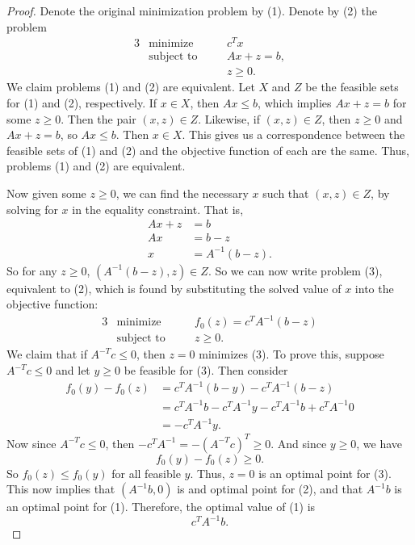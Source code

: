 \documentclass[12pt]{article}
\begin{document}
\begin{proof}
    Denote the original minimization problem by (1). Denote by (2) the problem
    \begin{alignat*}{3}
        &\text{minimize}    &\quad& c^Tx \\
        &\text{subject to}  &\quad& Ax + z= b, \\
                                &&& z\geq 0.
    \end{alignat*}
    We claim problems (1) and (2) are equivalent. Let $X$ and $Z$ be the feasible sets for (1) and (2), respectively. If $x\in X$, then $Ax\leq b$, which implies $Ax+z = b$ for some $z\geq 0$. Then the pair $(x,z)\in Z$. Likewise, if $(x,z)\in Z$, then $z\geq0$ and $Ax+z=b$, so $Ax\leq b$. Then $x\in X$. This gives us a correspondence between the feasible sets of (1) and (2) and the objective function of each are the same. Thus, problems (1) and (2) are equivalent. 
    
    Now given some $z\geq0$, we can find the necessary $x$ such that $(x,z)\in Z$, by solving for $x$ in the equality constraint. That is,
    \begin{align*}
        Ax + z &= b \\
        Ax &= b-z \\
        x &= A^{-1}(b-z).
    \end{align*}
    So for any $z\geq0$, $(A^{-1}(b-z), z)\in Z$. So we can now write problem (3), equivalent to (2), which is found by substituting the solved value of $x$ into the objective function:
    \begin{alignat*}{3}
        &\text{minimize}    &\quad& f_0(z) = c^TA^{-1}(b-z) \\
        &\text{subject to}  &\quad& z\geq 0.
    \end{alignat*}
    We claim that if $A^{-T}c\leq0$, then $z=0$ minimizes (3). To prove this, suppose $A^{-T}c\leq0$ and let $y\geq0$ be feasible for (3). Then consider
    \begin{align*}
        f_0(y)-f_0(z)
            &= c^TA^{-1}(b-y) - c^TA^{-1}(b-z) \\
            &= c^TA^{-1}b - c^TA^{-1}y - c^TA^{-1}b + c^TA^{-1}0 \\
            &= - c^TA^{-1}y.
    \end{align*}
    Now since $A^{-T}c\leq0$, then $-c^TA^{-1}=-(A^{-T}c)^T\geq0$. And since $y\geq0$, we have
    \[f_0(y)-f_0(z) \geq 0.\]
    So $f_0(z)\leq f_0(y)$ for all feasible $y$. Thus, $z=0$ is an optimal point for (3). This now implies that $(A^{-1}b, 0)$ is and optimal point for (2), and that $A^{-1}b$ is an optimal point for (1). Therefore, the optimal value of (1) is 
    \[c^TA^{-1}b.\]
    

\end{proof}
\end{document}
